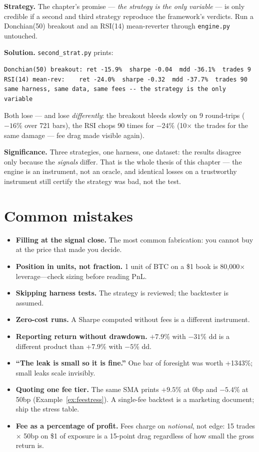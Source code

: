 \begin{example}\label{ex:secondstrat}
\textbf{Strategy.} The chapter's promise --- \emph{the strategy is
the only variable} --- is only credible if a second and third
strategy reproduce the framework's verdicts. Run a Donchian(50)
breakout and an RSI(14) mean-reverter through \texttt{engine.py}
untouched.

\textbf{Solution.} \texttt{second\_strat.py} prints:
\begin{verbatim}
Donchian(50) breakout: ret -15.9%  sharpe -0.04  mdd -36.1%  trades 9
RSI(14) mean-rev:    ret -24.0%  sharpe -0.32  mdd -37.7%  trades 90
same harness, same data, same fees -- the strategy is the only variable
\end{verbatim}
Both lose --- and lose \emph{differently}: the breakout bleeds
slowly on 9 round-trips ($-16\%$ over 721 bars), the RSI chops
90 times for $-24\%$ (10$\times$ the trades for the same
damage --- fee drag made visible again).

\textbf{Significance.} Three strategies, one harness, one dataset:
the results disagree only because the \emph{signals} differ. That
is the whole thesis of this chapter --- the engine is an
instrument, not an oracle, and identical losses on a trustworthy
instrument still certify the strategy was bad, not the test.
\end{example}

\section{Common mistakes}
\begin{itemize}
\item \textbf{Filling at the signal close.} The most common fabrication: you cannot buy at
  the price that made you decide.
\item \textbf{Position in units, not fraction.} 1 unit of BTC on a \$1 book is 80{,}000$\times$
  leverage---check sizing before reading PnL.
\item \textbf{Skipping harness tests.} The strategy is reviewed; the backtester is assumed.
\item \textbf{Zero-cost runs.} A Sharpe computed without fees is a different instrument.
\item \textbf{Reporting return without drawdown.} $+7.9$\% with $-31$\% dd is a different
  product than +7.9\% with $-5$\% dd.
\item \textbf{``The leak is small so it is fine.''} One bar of foresight was worth +1343\%;
  small leaks scale invisibly.
\item \textbf{Quoting one fee tier.} The same SMA prints
$+9.5\%$ at 0bp and $-5.4\%$ at 50bp (Example~\ref{ex:feestress}).
A single-fee backtest is a marketing document; ship the stress
table.
\item \textbf{Fee as a percentage of profit.} Fees charge on
\emph{notional}, not edge: 15 trades $\times$ 50bp on \$1 of
exposure is a 15-point drag regardless of how small the gross
return is.\end{itemize}

